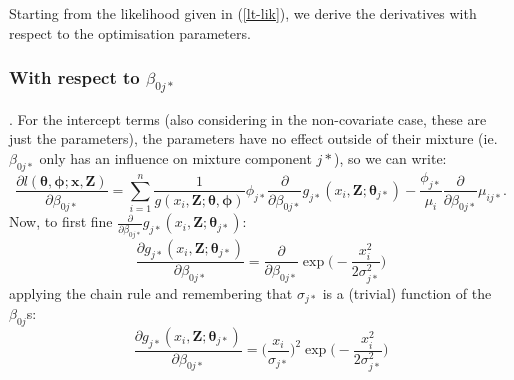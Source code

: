 \documentclass[useAMS,referee, usegraphicx]{biom}
\begin{document}
Starting from the likelihood given in (\ref{lt-lik}), we derive the derivatives with respect to the optimisation parameters.

\subsubsection*{With respect to $\beta_{0j*}$}. For the intercept terms (also considering in the non-covariate case, these are just the parameters), the parameters have no effect outside of their mixture (ie. $\beta_{0j*}$ only has an influence on mixture component $j*$), so we can write:
\begin{equation*}
\frac{\partial l(\bm{\theta},\bm{\phi}; \mathbf{x},\mathbf{Z})}{\partial \beta_{0j*}} = \sum_{i=1}^n \frac{1}{g(x_i,\mathbf{Z}; \bm{\theta},\bm{\phi})} \phi_{j*} \frac{\partial}{\partial \beta_{0j*}} g_{j*}(x_i,\mathbf{Z}; \bm{\theta}_{j*})  - \frac{\phi_{j*}}{\mu_i}  \frac{\partial}{\partial \beta_{0j*}} \mu_{ij*}.
\end{equation*}
Now, to first fine $\frac{\partial}{\partial \beta_{0j*}} g_{j*}(x_i,\mathbf{Z}; \bm{\theta}_{j*})$:
\begin{equation*}
\frac{\partial g_{j*}(x_i,\mathbf{Z}; \bm{\theta}_{j*})}{\partial \beta_{0j*}} = \frac{\partial}{\partial \beta_{0j*}} \exp\Big( -\frac{x_i^2}{2\sigma_{j*}^2} \Big)
\end{equation*}
applying the chain rule and remembering that $\sigma_{j*}$ is a (trivial) function of the $\beta_{0j}$s:
\begin{equation*}
\frac{\partial g_{j*}(x_i,\mathbf{Z}; \bm{\theta}_{j*})}{\partial \beta_{0j*}} = \Big( \frac{x_i}{\sigma_{j*}}\Big)^2 \exp \Big(-\frac{x_i^2}{2 \sigma_{j*}^2}\Big)
\end{equation*}
\end{document}
